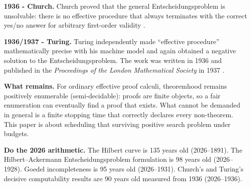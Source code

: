 \documentclass[11pt]{article}
\theoremstyle{hilberttheorem}
\begin{document}
\textbf{1936 - Church.} Church proved that the general Entscheidungsproblem is unsolvable: there is no effective procedure that always terminates with the correct yes/no answer for arbitrary first-order validity \cite{church1936,churchnote1936}.

\textbf{1936/1937 - Turing.} Turing independently made ``effective procedure'' mathematically precise with his machine model and again obtained a negative solution to the Entscheidungsproblem. The work was written in 1936 and published in the \emph{Proceedings of the London Mathematical Society} in 1937 \cite{turing1936,sep2026}.

\textbf{What remains.} For ordinary effective proof calculi, theoremhood remains positively enumerable (semi-decidable): proofs are finite objects, so a fair enumeration can eventually find a proof that exists. What cannot be demanded in general is a finite stopping time that correctly declares every non-theorem. This paper is about scheduling that surviving positive search problem under budgets.

\textbf{Do the 2026 arithmetic.} The Hilbert curve is 135 years old (2026--1891). The Hilbert--Ackermann Entscheidungsproblem formulation is 98 years old (2026--1928). Goedel incompleteness is 95 years old (2026--1931). Church's and Turing's decisive computability results are 90 years old measured from 1936 (2026--1936).
\end{document}
